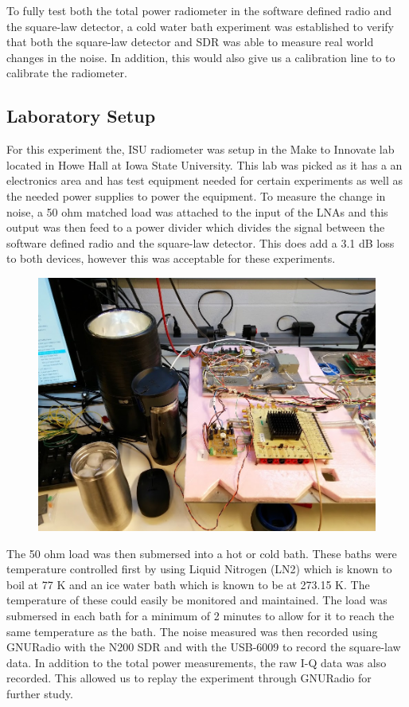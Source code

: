 To fully test both the total power radiometer in the software defined radio and the square-law detector, a cold water bath experiment was established to verify that both the square-law detector and SDR was able to measure real world changes in the noise.  In addition, this would also give us a calibration line to to calibrate the radiometer.

\subsection{Laboratory Setup}
For this experiment the, ISU radiometer was setup in the Make to Innovate lab located in Howe Hall at Iowa State University.  This lab was picked as it has a an electronics area and has test equipment needed for certain experiments as well as the needed power supplies to power the equipment.  To measure the change in noise, a 50 ohm matched load was attached to the input of the LNAs and this output was then feed to a power divider which divides the signal between the software defined radio and the square-law detector.  This does add a 3.1 dB loss to both devices, however this was acceptable for these experiments.

\begin{figure}[h!tb] \centering

\includegraphics[width=\textwidth]{Images/exp1_setup.jpg}

\label{LabSetup}
\end{figure}

The 50 ohm load was then submersed into a hot or cold bath.  These baths were temperature controlled first by using Liquid Nitrogen (LN2) which is known to boil at 77 K and an ice water bath which is known to be at 273.15 K.  The temperature of these could easily be monitored and maintained.  The load was submersed in each bath for a minimum of 2 minutes to allow for it to reach the same temperature as the bath.  The noise measured was then recorded using GNURadio with the N200 SDR and with the USB-6009 to record the square-law data.  In addition to the total power measurements, the raw I-Q data was also recorded.  This allowed us to replay the experiment through GNURadio for further study.
